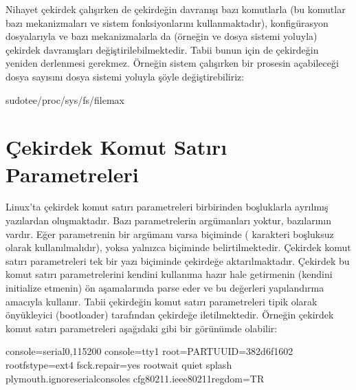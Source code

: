 \documentclass[a4paper,10pt,turkish]{sphinxmanual}
\begin{document}
\sphinxAtStartPar
Nihayet çekirdek çalışırken de çekirdeğin davranışı bazı komutlarla (bu komutlar bazı mekanizmaları
ve sistem fonksiyonlarını kullanmaktadır), konfigürasyon dosyalarıyla ve bazı mekanizmalarla da
(örneğin  ve  dosya sistemi yoluyla) çekirdek davranışları değiştirilebilmektedir. Tabii
bunun için de çekirdeğin yeniden derlenmesi gerekmez. Örneğin sistem çalışırken bir prosesin
açabileceği dosya sayısını  dosya sistemi yoluyla şöyle değiştirebiliriz:

\begin{sphinxVerbatim}[commandchars=\\\{\}]
\PYGZdl{}sudotee/proc/sys/fs/file\PYGZhy{}max
\end{sphinxVerbatim}


\section{Çekirdek Komut Satırı Parametreleri}
\label{\detokenize{kernelcompilation:cekirdek-komut-satiri-parametreleri}}
\sphinxAtStartPar
Linux’ta çekirdek komut satırı parametreleri birbirinden boşluklarla ayrılmış yazılardan
oluşmaktadır. Bazı parametrelerin argümanları yoktur, bazılarının vardır. Eğer parametrenin bir
argümanı varsa  biçiminde (\sphinxcode{\sphinxupquote{=}} karakteri boşluksuz olarak kullanılmalıdır),
yoksa yalnızca  biçiminde belirtilmektedir. Çekirdek komut satırı parametreleri tek
bir yazı biçiminde çekirdeğe aktarılmaktadır. Çekirdek bu komut satırı parametrelerini kendini
kullanıma hazır hale getirmenin (kendini initialize etmenin) ön aşamalarında parse eder ve bu
değerleri yapılandırma amacıyla kullanır. Tabii çekirdeğin komut satırı parametreleri tipik olarak
önyükleyici (bootloader) tarafından çekirdeğe iletilmektedir. Örneğin çekirdek komut satırı
parametreleri aşağıdaki gibi bir görünümde olabilir:

\begin{sphinxVerbatim}[commandchars=\\\{\}]
console=serial0,115200 console=tty1 root=PARTUUID=382d6f16\PYGZhy{}02 rootfstype=ext4 fsck.repair=yes
rootwait quiet splash plymouth.ignore\PYGZhy{}serial\PYGZhy{}consoles cfg80211.ieee80211\PYGZus{}regdom=TR
\end{sphinxVerbatim}
\end{document}
